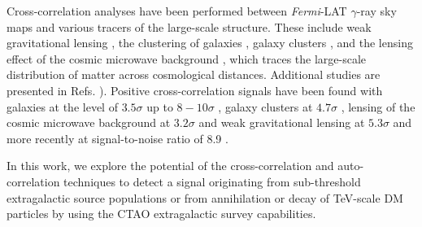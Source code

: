 Cross-correlation analyses have been performed between \textit{Fermi}-LAT $\gamma$-ray sky maps and various tracers of the large-scale structure. These include weak gravitational lensing  \cite{shirasaki2014cross,shirasaki2016cosmological,troster2017cross,DES:2019ucp}, the clustering of galaxies \cite{xia2015tomography,regis2015particle,cuoco2015dark,shirasaki2015cross,cuoco2017tomographic,Ammazzalorso:2018evf,paopiamsap2024constraints}, galaxy clusters \cite{branchini2017cross,shirasaki2018correlation,hashimoto2019measurement,colavincenzo2020searching,tan2020bounds}, and the lensing effect of the cosmic microwave background \cite{fornengo2015evidence}, which traces %
the large-scale distribution of matter across cosmological distances. Additional studies are presented in Refs. \cite{ando2014mapping,fornengo2014particle,fornasa2016angular,feng2017planck,Tan:2020fbc}). 
%
Positive cross-correlation signals have been found with galaxies at the level of $3.5\sigma$ \cite{xia2015tomography,regis2015particle,cuoco2015dark} up to $8-10\sigma$ \cite{paopiamsap2024constraints}, galaxy clusters at $4.7\sigma$ \cite{branchini2017cross}, lensing of the cosmic microwave background at $3.2\sigma$ \cite{fornengo2015evidence} and weak gravitational lensing at $5.3\sigma$ \cite{DES:2019ucp} and more recently at signal-to-noise ratio of 8.9  \cite{DES:2025ulp}.

In this work, we explore the potential of the cross-correlation and auto-correlation techniques to detect a signal originating from sub-threshold extragalactic source populations or from annihilation or decay of TeV-scale DM particles by using the CTAO extragalactic survey capabilities.






